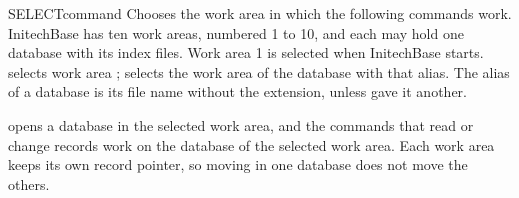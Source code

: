 \begin{XbaseEntry}{SELECT}{command}
Chooses the work area in which the following commands work.
\Syntax
{}
\Usage
InitechBase has ten work areas, numbered 1 to 10, and each may hold one
database with its index files.  Work area 1 is selected when InitechBase
starts.    selects work area ;  
selects the work area of the database with that alias.  The alias of a
database is its file name without the extension, unless  gave it
another.

 opens a database in the selected work area, and the commands that
read or change records work on the database of the selected work area.  Each
work area keeps its own record pointer, so moving in one database does not
move the others.
\Examples
{}
\end{XbaseEntry}

